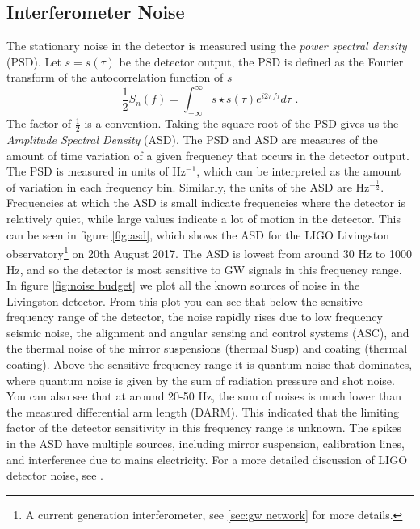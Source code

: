 \documentclass[11pt]{cuthesis}
\newcommand{\fs}{\text{ .}}
\newcommand{\infint}{\int^\infty_{-\infty} }
\begin{document}
\subsection{Interferometer Noise}
The stationary noise in the detector is measured using the \emph{power spectral density} (PSD). Let $s=s(\tau)$ be the detector output, the PSD is defined as the Fourier transform of the autocorrelation function of $s$
\begin{equation} \label{eqn:PSD}
\frac{1}{2} S_n(f)=\infint s \star s(\tau)e^{i 2\pi f \tau} d\tau \fs
\end{equation}
The factor of $\frac{1}{2}$ is a convention. Taking the square root of the PSD gives us the \textit{Amplitude Spectral Density} (ASD). The PSD and ASD are measures of the amount of time variation of a given frequency that occurs in the detector output. The PSD is measured in units of Hz$^{-1}$, which can be interpreted as the amount of variation in each frequency bin. Similarly, the units of the ASD are Hz$^{-\frac{1}{2}}$. Frequencies at which the ASD is small indicate frequencies where the detector is relatively quiet, while large values indicate a lot of motion in the detector. This can be seen in figure \ref{fig:asd}, which shows the ASD for the LIGO Livingston observatory\footnote{A current generation interferometer, see \ref{sec:gw network} for more details.} on 20th August 2017. The ASD is lowest from around 30 Hz to 1000 Hz, and so the detector is most sensitive to GW signals in this frequency range. In figure \ref{fig:noise budget} we plot all the known sources of noise in the Livingston detector. From this plot you can see that below the sensitive frequency range of the detector, the noise rapidly rises due to low frequency seismic noise, the alignment and angular sensing and control systems (ASC), and the thermal noise of the mirror suspensions (thermal Susp) and coating (thermal coating). Above the sensitive frequency range it is quantum noise that dominates, where quantum noise is given by the sum of radiation pressure and shot noise. You can also see that at around 20-50 Hz, the sum of noises is much lower than the measured differential arm length (DARM). This indicated that the limiting factor of the detector sensitivity in this frequency range is unknown. The spikes in the ASD have multiple sources, including mirror suspension, calibration lines, and interference due to mains electricity. For a more detailed discussion of LIGO detector noise, see \cite{noise_budget_martynov} \cite{GW150914-detector} .
\end{document}
